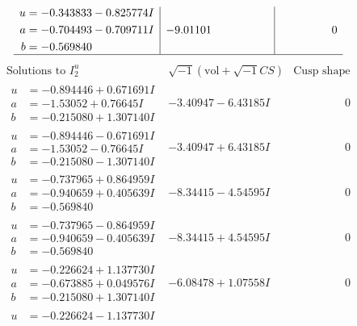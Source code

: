 \documentclass[1p]{elsarticle_modified}
\theoremstyle{definition}
\newcommand{\I}{\sqrt{-1}}
\begin{document}
$$\begin{array}{c|c|c}
\begin{aligned}
u &= -0.343833 - 0.825774 I \\
a &= -0.704493 - 0.709711 I \\
b &= -0.569840\phantom{ +0.000000I}\end{aligned}
 & -9.01101\phantom{ +0.000000I} & \phantom{-0.000000 } 0\\
 \hline 
 \end{array}$$\newpage$$\begin{array}{c|c|c}  
\text{Solutions to }I^u_{2}& \I (\text{vol} + \sqrt{-1}CS) & \text{Cusp shape}\\
 \hline 
\begin{aligned}
u &= -0.894446 + 0.671691 I \\
a &= -1.53052 + 0.76645 I \\
b &= -0.215080 + 1.307140 I\end{aligned}
 & -3.40947 - 6.43185 I & \phantom{-0.000000 } 0 \\ \hline\begin{aligned}
u &= -0.894446 - 0.671691 I \\
a &= -1.53052 - 0.76645 I \\
b &= -0.215080 - 1.307140 I\end{aligned}
 & -3.40947 + 6.43185 I & \phantom{-0.000000 } 0 \\ \hline\begin{aligned}
u &= -0.737965 + 0.864959 I \\
a &= -0.940659 + 0.405639 I \\
b &= -0.569840\phantom{ +0.000000I}\end{aligned}
 & -8.34415 - 4.54595 I & \phantom{-0.000000 } 0 \\ \hline\begin{aligned}
u &= -0.737965 - 0.864959 I \\
a &= -0.940659 - 0.405639 I \\
b &= -0.569840\phantom{ +0.000000I}\end{aligned}
 & -8.34415 + 4.54595 I & \phantom{-0.000000 } 0 \\ \hline\begin{aligned}
u &= -0.226624 + 1.137730 I \\
a &= -0.673885 + 0.049576 I \\
b &= -0.215080 + 1.307140 I\end{aligned}
 & -6.08478 + 1.07558 I & \phantom{-0.000000 } 0 \\ \hline\begin{aligned}
u &= -0.226624 - 1.137730 I \\

\end{aligned}
\end{array}$$
\end{document}
